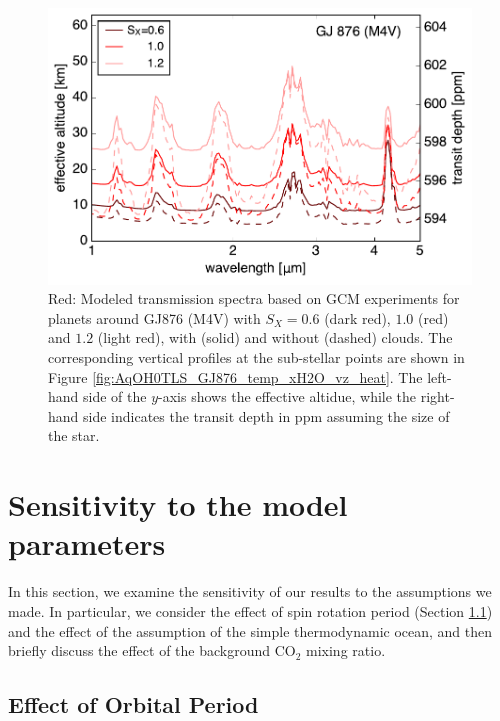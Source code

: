 \documentclass[11pt,numberedappendix,twocolappendix,]{emulateapj}
\begin{document}
\begin{figure}[!h]
    \begin{center}
    \includegraphics[width=\hsize]{fig/transit_GJ876.pdf}
    \end{center}
\caption{Red: Modeled transmission spectra based on GCM experiments for planets around GJ876 (M4V) with $S_X=0.6$ (dark red), $1.0$ (red) and $1.2$ (light red), with (solid) and without (dashed) clouds. The corresponding vertical profiles at the sub-stellar points are shown in Figure \ref{fig:AqOH0TLS_GJ876_temp_xH2O_vz_heat}. The left-hand side of the $y$-axis shows the effective altidue, while the right-hand side indicates the transit depth in ppm assuming the size of the star. }
\label{fig:transmission}
\end{figure}


\section{Sensitivity to the model parameters}
\label{s:sensitivity}

In this section, we examine the sensitivity of our results to the  assumptions we made. 
In particular, we consider the effect of spin rotation period (Section \ref{ss:sensitivity_Porbit}) and the effect of the assumption of the simple thermodynamic ocean, and then briefly discuss the effect of the background CO$_2$ mixing ratio. 


\subsection{Effect of Orbital Period}
\label{ss:sensitivity_Porbit}
\end{document}
